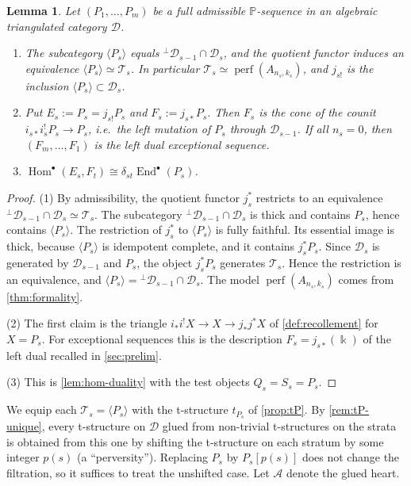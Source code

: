 \documentclass[11pt,reqno]{amsart}
\theoremstyle{plain}
\newtheorem{lemma}[theorem]{Lemma}
\theoremstyle{definition}
\theoremstyle{remark}
\newcommand{\kk}{\Bbbk}
\DeclareMathOperator{\Hom}{Hom}
\DeclareMathOperator{\End}{End}
\newcommand{\thick}[1]{\langle #1\rangle}
\newcommand{\cD}{\mathcal{D}}
\newcommand{\cA}{\mathcal{A}}
\newcommand{\cT}{\mathcal{T}}
\begin{document}
\begin{lemma}\label{lem:P-strata}
Let $(P_1,\dots,P_m)$ be a full admissible $\mathbb{P}$-sequence in an algebraic triangulated category $\cD$.
\begin{enumerate}
\item The subcategory $\thick{P_s}$ equals ${}^\perp\cD_{s-1}\cap\cD_s$, and the quotient functor induces an equivalence $\thick{P_s}\simeq\cT_s$. In particular $\cT_s\simeq\operatorname{perf}(A_{n_s,k_s})$, and $j_{s!}$ is the inclusion $\thick{P_s}\subset\cD_s$.
\item Put $E_s:=P_s=j_{s!}P_s$ and $F_s:=j_{s*}P_s$. Then $F_s$ is the cone of the counit $i_{s*}i_s^!P_s\to P_s$, i.e.\ the left mutation of $P_s$ through $\cD_{s-1}$. If all $n_s=0$, then $(F_m,\dots,F_1)$ is the left dual exceptional sequence.
\item $\Hom^\bullet(E_s,F_t)\cong\delta_{st}\End^\bullet(P_s)$.
\end{enumerate}
\end{lemma}

\begin{proof}
(1) By admissibility, the quotient functor $j_s^*$ restricts to an equivalence ${}^\perp\cD_{s-1}\cap\cD_s\simeq\cT_s$. The subcategory ${}^\perp\cD_{s-1}\cap\cD_s$ is thick and contains $P_s$, hence contains $\thick{P_s}$. The restriction of $j_s^*$ to $\thick{P_s}$ is fully faithful. Its essential image is thick, because $\thick{P_s}$ is idempotent complete, and it contains $j_s^*P_s$. Since $\cD_s$ is generated by $\cD_{s-1}$ and $P_s$, the object $j_s^*P_s$ generates $\cT_s$. Hence the restriction is an equivalence, and $\thick{P_s}={}^\perp\cD_{s-1}\cap\cD_s$. The model $\operatorname{perf}(A_{n_s,k_s})$ comes from \cref{thm:formality}.

(2) The first claim is the triangle $i_*i^!X\to X\to j_*j^*X$ of \cref{def:recollement} for $X=P_s$. For exceptional sequences this is the description $F_s=j_{s*}(\kk)$ of the left dual recalled in \cref{sec:prelim}.

(3) This is \cref{lem:hom-duality} with the test objects $Q_s=S_s=P_s$.
\end{proof}

We equip each $\cT_s=\thick{P_s}$ with the t-structure $t_{P_s}$ of \cref{prop:tP}. By \cref{rem:tP-unique}, every t-structure on $\cD$ glued from non-trivial t-structures on the strata is obtained from this one by shifting the t-structure on each stratum by some integer $p(s)$ (a ``perversity''). Replacing $P_s$ by $P_s[p(s)]$ does not change the filtration, so it suffices to treat the unshifted case. Let $\cA$ denote the glued heart.
\end{document}
